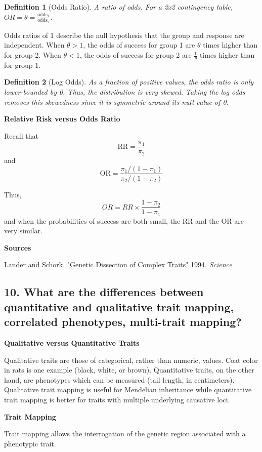 \documentclass{tufte-handout}
\theoremstyle{noparens}
\newtheorem*{define}{Definition}
\begin{document}
\begin{define}[Odds Ratio]
A ratio of odds. For a 2x2 contingency table, $OR = \theta = \frac{\text{odds}_1}{\text{odds}_2}$.
\end{define}

Odds ratios of 1 describe the null hypothesis that the group and response are independent. When $\theta > 1$, the odds of success for group 1 are $\theta$ times higher than for group 2. When $\theta < 1$, the odds of success for group 2 are $\frac{1}{\theta}$ times higher than for group 1.

\begin{define}[Log Odds]
As a fraction of positive values, the odds ratio is only lower-bounded by 0. Thus, the distribution is very skewed. Taking the log odds removes this skewedness since it is symmetric around its null value of 0.
\end{define}

\textbf{Relative Risk versus Odds Ratio}

Recall that \[ \text{RR} = \frac{\pi_1}{\pi_2} \] and \[ \text{OR} = \frac{\pi_1 / (1-\pi_1)}{\pi_2 / (1-\pi_2)} \]

Thus, \[ OR = RR \times \frac{1-\pi_2}{1-\pi_1} \] and when the probabilities of success are both small, the RR and the OR are very similar.
 
 \textbf{Sources}
 
 Lander and Schork. "Genetic Dissection of Complex Traits" 1994. \emph{Science}
 
\newpage
\subsection{10.
What are the differences between quantitative and qualitative trait mapping, correlated phenotypes, multi-trait mapping?}

\textbf{Qualitative versus Quantitative Traits}

Qualitative traits are those of categorical, rather than numeric, values. Coat color in rats is one example (black, white, or brown). Quantitative traits, on the other hand, are phenotypes which can be measured (tail length, in centimeters). Qualitative trait mapping is useful for Mendelian inheritance while quantitative trait mapping is better for traits with multiple underlying causative loci.

\textbf{Trait Mapping}

Trait mapping allows the interrogation of the genetic region associated with a phenotypic trait. 
\end{document}
